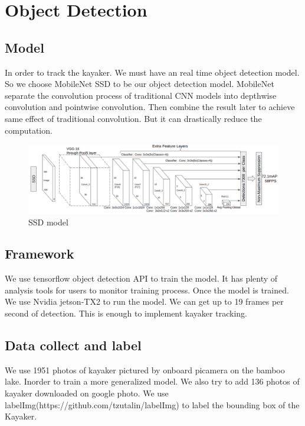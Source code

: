 \section{Object Detection}

\subsection{Model}

In order to track the kayaker. We must have an real time object detection model. So we choose MobileNet SSD to be our object detection model.
MobileNet separate the convolution process of traditional CNN models into depthwise convolution and pointwise convolution. Then combine the result later to achieve same effect of traditional convolution. But it can drastically reduce the computation.

\begin{figure}[h]
    \includegraphics[width=1\columnwidth]{images/mobilenetssd.png}
    \centering
    \caption{SSD model}
    \label{figure:mobilenetssd}
\end{figure}

\subsection{Framework}

We use tensorflow object detection API to train the model. It has plenty of analysis tools for users to monitor training process. Once the model is trained. We use Nvidia jetson-TX2 to run the model. We can get up to 19 frames per second of detection. This is enough to implement kayaker tracking.

\subsection{Data collect and label}

We use 1951 photos of kayaker pictured by onboard picamera on the bamboo lake. Inorder to train a more generalized model. We also try to add 136 photos of kayaker downloaded on google photo. We use labelImg(https://github.com/tzutalin/labelImg) to label the bounding box of the Kayaker.

